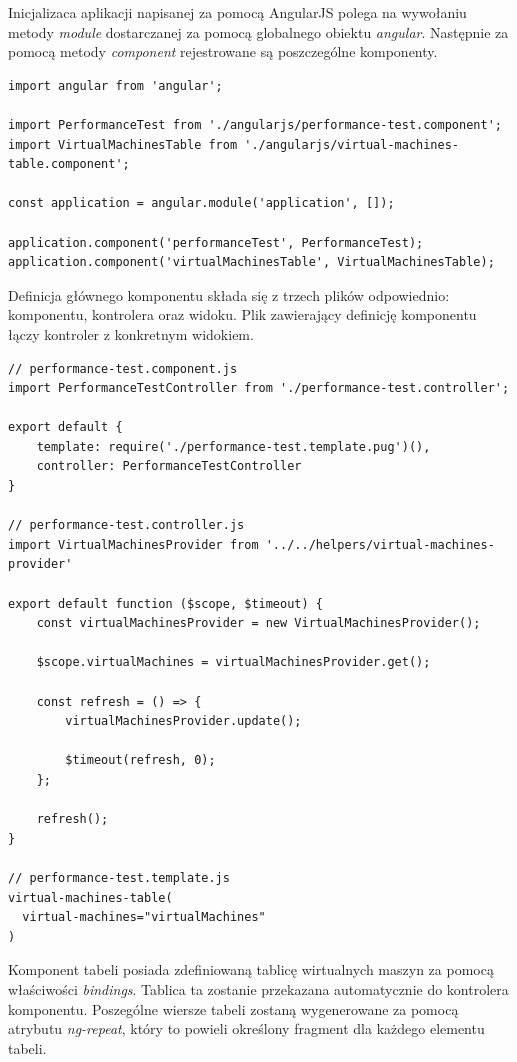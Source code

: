 \documentclass[polish, twoside, 12pt]{mwart}
\begin{document}
Inicjalizaca aplikacji napisanej za pomocą AngularJS polega na wywołaniu metody \emph{module} dostarczanej za pomocą globalnego obiektu \emph{angular}. Następnie za pomocą metody \emph{component} rejestrowane są poszczególne komponenty.

\begin{lstlisting}[caption=Inicjalizacja aplikacji oraz rejestracja komponentów]
import angular from 'angular';

import PerformanceTest from './angularjs/performance-test.component';
import VirtualMachinesTable from './angularjs/virtual-machines-table.component';

const application = angular.module('application', []);

application.component('performanceTest', PerformanceTest);
application.component('virtualMachinesTable', VirtualMachinesTable);
\end{lstlisting}

Definicja głównego komponentu składa się z trzech plików odpowiednio: komponentu, kontrolera oraz widoku. Plik zawierający definicję komponentu łączy kontroler z konkretnym widokiem.

\begin{lstlisting}[caption=Główny komponent]
// performance-test.component.js
import PerformanceTestController from './performance-test.controller';

export default {
    template: require('./performance-test.template.pug')(),
    controller: PerformanceTestController
}

// performance-test.controller.js
import VirtualMachinesProvider from '../../helpers/virtual-machines-provider'

export default function ($scope, $timeout) {
    const virtualMachinesProvider = new VirtualMachinesProvider();
    
    $scope.virtualMachines = virtualMachinesProvider.get();
    
    const refresh = () => {
        virtualMachinesProvider.update();

        $timeout(refresh, 0);
    };

    refresh();
}

// performance-test.template.js
virtual-machines-table(
  virtual-machines="virtualMachines"
)
\end{lstlisting}

Komponent tabeli posiada zdefiniowaną tablicę wirtualnych maszyn za pomocą właściwości \emph{bindings}. Tablica ta zostanie przekazana automatycznie do kontrolera komponentu. Poszególne wiersze tabeli zostaną wygenerowane za pomocą atrybutu \emph{ng-repeat}, który to powieli określony fragment dla każdego elementu tabeli.
\end{document}
